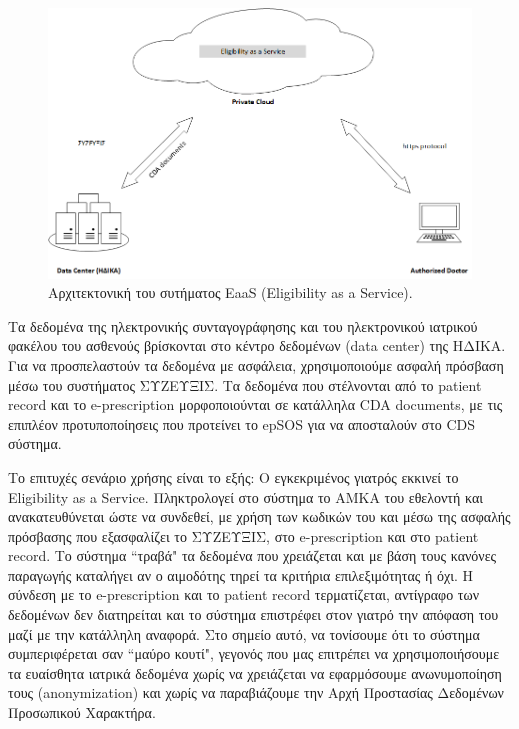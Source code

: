 			\begin{figure}[h]
	    \centering
	    \includegraphics[width=1\textwidth]{Architecture_high.png}
	    \caption{Αρχιτεκτονική του συτήματος EaaS (Eligibility as a Service). }
	    \label{fig:architecture_EaaS}
	\end{figure}
	
		
		Τα δεδομένα της ηλεκτρονικής συνταγογράφησης και του ηλεκτρονικού ιατρικού φακέλου του ασθενούς βρίσκονται στο κέντρο δεδομένων (data center) της ΗΔΙΚΑ. Για να προσπελαστούν τα δεδομένα με ασφάλεια, χρησιμοποιούμε ασφαλή πρόσβαση μέσω του συστήματος ΣΥΖΕΥΞΙΣ. Τα δεδομένα που στέλνονται από το patient record και το e-prescription μορφοποιούνται σε κατάλληλα CDA documents, με τις επιπλέον προτυποποίησεις που προτείνει το epSOS για να αποσταλούν στο CDS σύστημα.
		
		Το επιτυχές σενάριο χρήσης είναι το εξής: Ο εγκεκριμένος γιατρός εκκινεί το Eligibility as a Service. Πληκτρολογεί στο σύστημα το ΑΜΚΑ του εθελοντή και ανακατευθύνεται ώστε να συνδεθεί, με χρήση των κωδικών του και μέσω της ασφαλής πρόσβασης που εξασφαλίζει το ΣΥΖΕΥΞΙΣ, στο e-prescription και στο patient record. Το σύστημα ``τραβά" τα δεδομένα που χρειάζεται και με βάση τους κανόνες παραγωγής καταλήγει αν ο αιμοδότης τηρεί τα κριτήρια επιλεξιμότητας ή όχι. Η σύνδεση με το e-prescription και το patient record τερματίζεται, αντίγραφο των δεδομένων δεν διατηρείται και το σύστημα επιστρέφει στον γιατρό την απόφαση του μαζί με την κατάλληλη αναφορά. Στο σημείο αυτό, να τονίσουμε ότι το σύστημα συμπεριφέρεται σαν ``μαύρο κουτί", γεγονός που μας επιτρέπει να χρησιμοποιήσουμε τα ευαίσθητα ιατρικά δεδομένα χωρίς να χρειάζεται να εφαρμόσουμε ανωνυμοποίηση τους (anonymization) και χωρίς να παραβιάζουμε την Αρχή Προστασίας Δεδομένων Προσωπικού Χαρακτήρα. 
		
		
		
		
		
		
		
		
		
		
		
		
		

